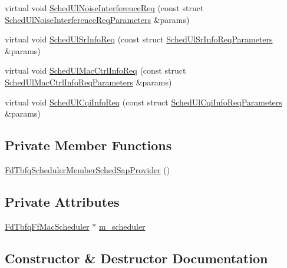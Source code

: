 \begin{DoxyCompactItemize}
\item 
virtual void \hyperlink{classns3_1_1FdTbfqSchedulerMemberSchedSapProvider_ac222a6cffe81e62dd338959fa0042835}{Sched\+Ul\+Noise\+Interference\+Req} (const struct \hyperlink{structns3_1_1FfMacSchedSapProvider_1_1SchedUlNoiseInterferenceReqParameters}{Sched\+Ul\+Noise\+Interference\+Req\+Parameters} \&params)
\item 
virtual void \hyperlink{classns3_1_1FdTbfqSchedulerMemberSchedSapProvider_a8720ee18beb01aacab94a8cd0a79008c}{Sched\+Ul\+Sr\+Info\+Req} (const struct \hyperlink{structns3_1_1FfMacSchedSapProvider_1_1SchedUlSrInfoReqParameters}{Sched\+Ul\+Sr\+Info\+Req\+Parameters} \&params)
\item 
virtual void \hyperlink{classns3_1_1FdTbfqSchedulerMemberSchedSapProvider_aceac9365bb188355621a756511a86716}{Sched\+Ul\+Mac\+Ctrl\+Info\+Req} (const struct \hyperlink{structns3_1_1FfMacSchedSapProvider_1_1SchedUlMacCtrlInfoReqParameters}{Sched\+Ul\+Mac\+Ctrl\+Info\+Req\+Parameters} \&params)
\item 
virtual void \hyperlink{classns3_1_1FdTbfqSchedulerMemberSchedSapProvider_a5512daabdbd04ff7d7ae3e52950dee53}{Sched\+Ul\+Cqi\+Info\+Req} (const struct \hyperlink{structns3_1_1FfMacSchedSapProvider_1_1SchedUlCqiInfoReqParameters}{Sched\+Ul\+Cqi\+Info\+Req\+Parameters} \&params)
\end{DoxyCompactItemize}
\subsection*{Private Member Functions}
\begin{DoxyCompactItemize}
\item 
\hyperlink{classns3_1_1FdTbfqSchedulerMemberSchedSapProvider_a8a0dae9d7340c560c6663919df640525}{Fd\+Tbfq\+Scheduler\+Member\+Sched\+Sap\+Provider} ()
\end{DoxyCompactItemize}
\subsection*{Private Attributes}
\begin{DoxyCompactItemize}
\item 
\hyperlink{classns3_1_1FdTbfqFfMacScheduler}{Fd\+Tbfq\+Ff\+Mac\+Scheduler} $\ast$ \hyperlink{classns3_1_1FdTbfqSchedulerMemberSchedSapProvider_a796c8957deb5d1f76995f917d68fc1a3}{m\+\_\+scheduler}
\end{DoxyCompactItemize}


\subsection{Constructor \& Destructor Documentation}
